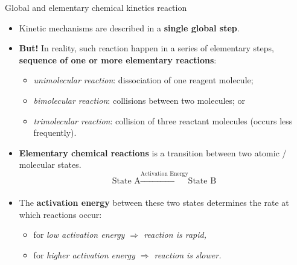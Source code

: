 \begin{frame}[<+->][shrink]{Global and elementary chemical kinetics reaction}
	
	\begin{itemize}
		\item Kinetic mechanisms are described in a \textbf{single global step}. 
		\item \textbf{But!} In reality, such reaction happen in a series of elementary steps, \textbf{sequence of one or more
			elementary reactions}:
		\begin{itemize}
			\item {\it unimolecular reaction}: dissociation of one reagent molecule;
			\item {\it bimolecular reaction}: collisions between two molecules; or
			\item{ \it trimolecular reaction}: collision of three reactant molecules (occurs less frequently).
		\end{itemize}
		\item \alert{\textbf{Elementary chemical reactions}} is a transition between two atomic / molecular states. 
		$$\mbox{State A} \xrightarrow[]{\text{Activation Energy}} \mbox{State B}$$
		\item The \textbf{activation energy} between these two states determines \alert{the rate at which reactions occur}: 
		\begin{itemize}
			\item for \it{low activation energy} $\Rightarrow$ reaction is rapid, 
			\item for \it{higher activation energy} $\Rightarrow$ reaction is slower.
		\end{itemize}
	\end{itemize}
	
\end{frame}
%
%
